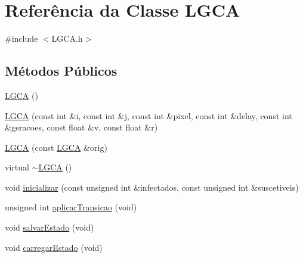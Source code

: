 \hypertarget{class_l_g_c_a}{
\section{Referência da Classe LGCA}
\label{class_l_g_c_a}
}


{\ttfamily \#include $<$LGCA.h$>$}

\subsection*{Métodos Públicos}
\begin{DoxyCompactItemize}
\item 
\hyperlink{class_l_g_c_a_ace248ffd3ca55886e9f53c924d958bf5}{LGCA} ()
\item 
\hyperlink{class_l_g_c_a_adcfe759af305f177e7f65d22d263396a}{LGCA} (const int \&i, const int \&j, const int \&pixel, const int \&delay, const int \&geracoes, const float \&v, const float \&r)
\item 
\hyperlink{class_l_g_c_a_a136dbb720c6b57ca5f8e83333f562c30}{LGCA} (const \hyperlink{class_l_g_c_a}{LGCA} \&orig)
\item 
virtual \hyperlink{class_l_g_c_a_a2478e6d12fa3ba935fafa75fbc4a909b}{$\sim$LGCA} ()
\item 
void \hyperlink{class_l_g_c_a_a5850288581a5a4bdf94e7dd189d158c1}{inicializar} (const unsigned int \&infectados, const unsigned int \&suscetiveis)
\item 
unsigned int \hyperlink{class_l_g_c_a_ad4c2cb405a0dc6fbc69001fe42bb7bab}{aplicarTransicao} (void)
\item 
void \hyperlink{class_l_g_c_a_a677fe7998c00ec042c79e32412330685}{salvarEstado} (void)
\item 
void \hyperlink{class_l_g_c_a_a991772654d1f45d6eb45c6bb12cdf93d}{carregarEstado} (void)
\end{DoxyCompactItemize}


